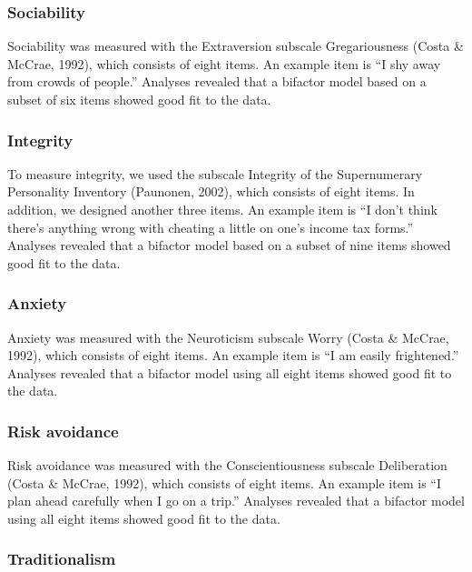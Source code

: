\documentclass[man,floatsintext]{apa6}
\begin{document}
\hypertarget{sociability-1}{%
\subsubsection{Sociability}\label{sociability-1}}

Sociability was measured with the Extraversion subscale Gregariousness (Costa \& McCrae, 1992), which consists of eight items. An example item is \enquote{I shy away from crowds of people.} Analyses revealed that a bifactor model based on a subset of six items showed good fit to the data.

\hypertarget{integrity-1}{%
\subsubsection{Integrity}\label{integrity-1}}

To measure integrity, we used the subscale Integrity of the Supernumerary Personality Inventory (Paunonen, 2002), which consists of eight items. In addition, we designed another three items. An example item is \enquote{I don't think there's anything wrong with cheating a little on one's income tax forms.} Analyses revealed that a bifactor model based on a subset of nine items showed good fit to the data.

\hypertarget{anxiety-1}{%
\subsubsection{Anxiety}\label{anxiety-1}}

Anxiety was measured with the Neuroticism subscale Worry (Costa \& McCrae, 1992), which consists of eight items. An example item is \enquote{I am easily frightened.} Analyses revealed that a bifactor model using all eight items showed good fit to the data.

\hypertarget{risk-avoidance-1}{%
\subsubsection{Risk avoidance}\label{risk-avoidance-1}}

Risk avoidance was measured with the Conscientiousness subscale Deliberation (Costa \& McCrae, 1992), which consists of eight items. An example item is \enquote{I plan ahead carefully when I go on a trip.} Analyses revealed that a bifactor model using all eight items showed good fit to the data.

\hypertarget{traditionalism}{%
\subsubsection{Traditionalism}\label{traditionalism}}
\end{document}
